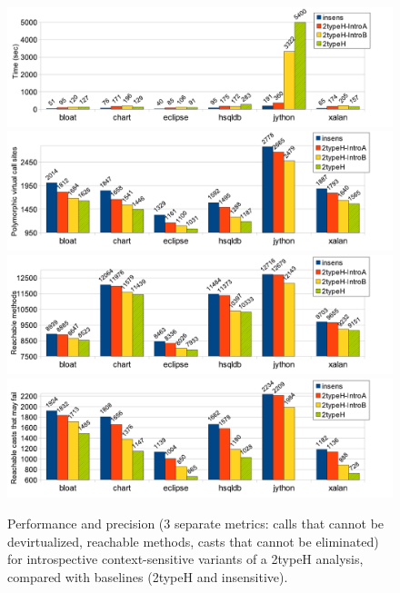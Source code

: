 \begin{figure}[tbp]
\begin{center}
\includegraphics[scale=0.54]{assets/introspective/2typeHtime.pdf} \\
\includegraphics[scale=0.54]{assets/introspective/2typeHvcalls.pdf} \\
\includegraphics[scale=0.54]{assets/introspective/2typeHmeths.pdf} \\
\includegraphics[scale=0.54]{assets/introspective/2typeHcasts.pdf}
\end{center}
\vspace{-0.65cm}
\caption{Performance and precision (3 separate metrics: calls that
  cannot be devirtualized, reachable methods, casts that cannot be
  eliminated) for introspective context-sensitive
 variants of a 2typeH analysis, compared with baselines (2typeH and insensitive).}
\label{2typeH-chart}
\end{figure}

